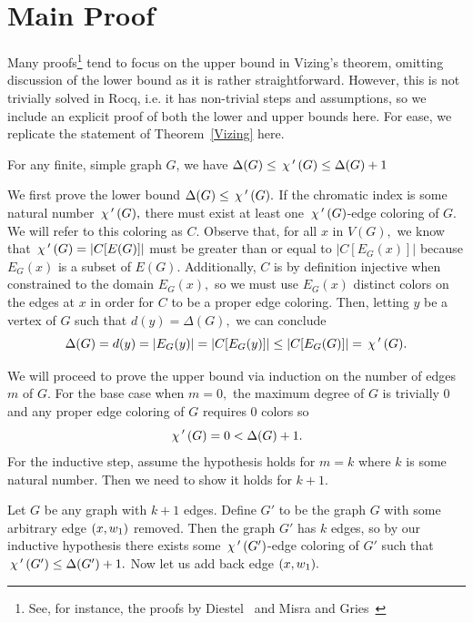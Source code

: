 \section{Main Proof}\label{section proof}
Many proofs\footnote{See, for instance, the proofs by Diestel~\cite{Diestel} and Misra and Gries~\cite{Misra}} tend to focus on the upper bound in Vizing's theorem, omitting discussion of the lower bound as it is rather straightforward. However, this is not trivially solved in Rocq, i.e. it has non-trivial steps and assumptions, so we include an explicit proof of both the lower and upper bounds here. For ease, we replicate the statement of Theorem~\ref{Vizing} here.
\begin{theorem}
    For any finite, simple graph $G$, we have $\Delta(G) \leq \,\chi\,'\,(G) \leq \Delta(G)+1$
\end{theorem}
We first prove the lower bound $\Delta(G) \leq \,\chi\,'\,(G).$ If the chromatic index is some natural number $\,\chi\,'\,(G),$ there must exist at least one $\,\chi\,'\,(G)$-edge coloring of $G$. We will refer to this coloring as $C.$ Observe that, for all $x$ in $V(G),$ we know that $\,\chi\,'\,(G) = |C[E(G)]|$ must be greater than or equal to $|C[E_G(x)]|$ because $E_G(x)$ is a subset of $E(G).$ Additionally, $C$ is by definition injective when constrained to the domain $E_G(x),$ so we must use $E_G(x)$ distinct colors on the edges at $x$ in order for $C$ to be a proper edge coloring. Then, letting $y$ be a vertex of $G$ such that $d(y) = \Delta(G),$ we can conclude
$$\Delta(G) = d(y) = |E_G(y)| = |C[E_G(y)]| \leq |C[E_G(G)]| = \,\chi\,'\,(G).$$ 

We will proceed to prove the upper bound via induction on the number of edges $m$ of $G.$ For the base case when $m = 0,$ the maximum degree of $G$ is trivially $0$ and any proper edge coloring of $G$ requires $0$ colors so $$\,\chi\,'\,(G) = 0 < \Delta(G) + 1.$$
For the inductive step, assume the hypothesis holds for $m = k$ where $k$ is some natural number. Then we need to show it holds for $k + 1.$

Let $G$ be any graph with $k + 1$ edges. Define $G'$ to be the graph $G$ with some arbitrary edge $(x, w_1)$ removed. Then the graph $G'$ has $k$ edges, so by our inductive hypothesis there exists some $\,\chi\,'\,(G')$-edge coloring of $G'$ such that $\,\chi\,'\,(G') \leq \Delta(G') + 1.$ Now let us add back edge $(x, w_1).$

